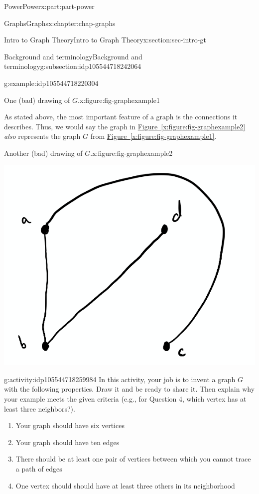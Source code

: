 \documentclass[oneside,10pt,]{book}
\newcommand{\xreffont}{\relax}
\numberwithin{equation}{section}
\begin{document}
\begin{partptx}{Power}{}{Power}{}{}{x:part:part-power}
\begin{chapterptx}{Graphs}{}{Graphs}{}{}{x:chapter:chap-graphs}
\begin{sectionptx}{Intro to Graph Theory}{}{Intro to Graph Theory}{}{}{x:section:sec-intro-gt}
\begin{subsectionptx}{Background and terminology}{}{Background and terminology}{}{}{g:subsection:idp105544718242064}
\begin{example}{}{g:example:idp105544718220304}
\begin{figureptx}{One (bad) drawing of \(G\).}{x:figure:fig-graphexample1}{}
\begin{image}{0.25}{0.5}{0.25}
\end{image}%
\tcblower
\end{figureptx}%
 As stated above, the most important feature of a graph is the connections it describes. Thus, we would say the graph in \hyperref[x:figure:fig-graphexample2]{Figure~{\xreffont\ref{x:figure:fig-graphexample2}}} \emph{also} represents the graph \(G\) from \hyperref[x:figure:fig-graphexample1]{Figure~{\xreffont\ref{x:figure:fig-graphexample1}}}. \begin{figureptx}{Another (bad) drawing of \(G\).}{x:figure:fig-graphexample2}{}%
\begin{image}{0.25}{0.5}{0.25}%
\includegraphics[width=\linewidth]{images/graph02.png}
\end{image}%
\tcblower
\end{figureptx}%
%
\end{example}
\begin{activity}{}{g:activity:idp105544718259984}%
In this activity, your job is to invent a graph \(G\) with the following properties. Draw it and be ready to share it. Then explain why your example meets the given criteria (e.g., for Question 4, which vertex has at least three neighbors?).%
%
\begin{enumerate}
\item{}Your graph should have six vertices%
\item{}Your graph should have ten edges%
\item{}There should be at least one pair of vertices between which you cannot trace a path of edges%
\item{}One vertex should should have at least three others in its neighborhood%

\end{enumerate}
\end{activity}
\end{subsectionptx}
\end{sectionptx}
\end{chapterptx}
\end{partptx}
\end{document}
